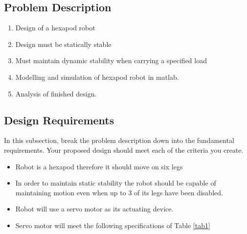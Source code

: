 \subsection{Problem Description}

\begin{enumerate}
	\item Design of a hexapod robot
	
	\item Design must be statically stable
	
	\item Must maintain dynamic stability when carrying a specified load
	
	\item Modelling and simulation of hexapod robot in matlab.
	
	\item Analysis of finished design.
	
\end{enumerate}





\subsection{Design Requirements}
In this subsection, break the problem description down into the fundamental requirements. Your proposed design should meet each of the criteria you create.

\begin{itemize}
	\item Robot is a hexapod therefore it should move on six legs
	\item In order to maintain static stability the robot should be capable of maintaining motion even when up to 3 of its legs have been disabled.
	\item Robot will use a servo motor as its actuating device.
	\item Servo motor will meet the following specifications of Table \ref{tab1}
	\end{itemize}

